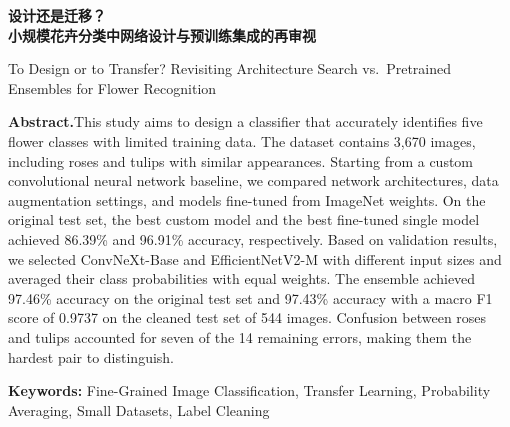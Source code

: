 \documentclass[11pt,a4paper,UTF8,fontset=windows]{ctexart}
\begin{document}
\pagestyle{plain}

\begin{center}
{\LARGE\bfseries 设计还是迁移？\\[2pt]
小规模花卉分类中网络设计与预训练集成的再审视\par}
\vspace{0.6em}
{\normalsize To Design or to Transfer? Revisiting Architecture Search vs.\ Pretrained Ensembles for Flower Recognition\par}
\end{center}

\vspace{0.6em}

\begin{abstract}
本文旨在为训练样本有限的花卉数据集设计分类模型，使其能够准确识别五类花卉。实验使用包含 3{,}670 张图像的数据集，其中玫瑰与郁金香的部分样本外观相近。以自建卷积神经网络为基线，比较了网络结构、数据增强与 ImageNet 预训练模型的微调方案。在原测试集上，表现最好的自建模型和预训练单模型的准确率分别为 86.39\% 和 96.91\%。根据验证集结果，选用输入尺寸不同的 ConvNeXt-Base 和 EfficientNetV2-M，对两者预测的类别概率取等权平均，集成准确率达到 97.46\%。该模型在清洗后的 544 张测试图像上取得 97.43\% 的准确率和 0.9737 的宏平均 F1。模型判错的 14 张图像中，有 7 张发生在玫瑰与郁金香之间，这两类仍是五类花卉中最难区分的一对。

\par\medskip
\noindent\textbf{关键词：} 细粒度图像分类；迁移学习；概率集成；小规模数据集；标签清洗
\end{abstract}

\vspace{0.4em}
{\small
\noindent\textbf{Abstract.}\quad This study aims to design a classifier that accurately identifies five flower classes with limited training data. The dataset contains 3{,}670 images, including roses and tulips with similar appearances. Starting from a custom convolutional neural network baseline, we compared network architectures, data augmentation settings, and models fine-tuned from ImageNet weights. On the original test set, the best custom model and the best fine-tuned single model achieved 86.39\% and 96.91\% accuracy, respectively. Based on validation results, we selected ConvNeXt-Base and EfficientNetV2-M with different input sizes and averaged their class probabilities with equal weights. The ensemble achieved 97.46\% accuracy on the original test set and 97.43\% accuracy with a macro F1 score of 0.9737 on the cleaned test set of 544 images. Confusion between roses and tulips accounted for seven of the 14 remaining errors, making them the hardest pair to distinguish.

\medskip
\noindent\textbf{Keywords:} Fine-Grained Image Classification, Transfer Learning, Probability Averaging, Small Datasets, Label Cleaning\par}
\end{document}
